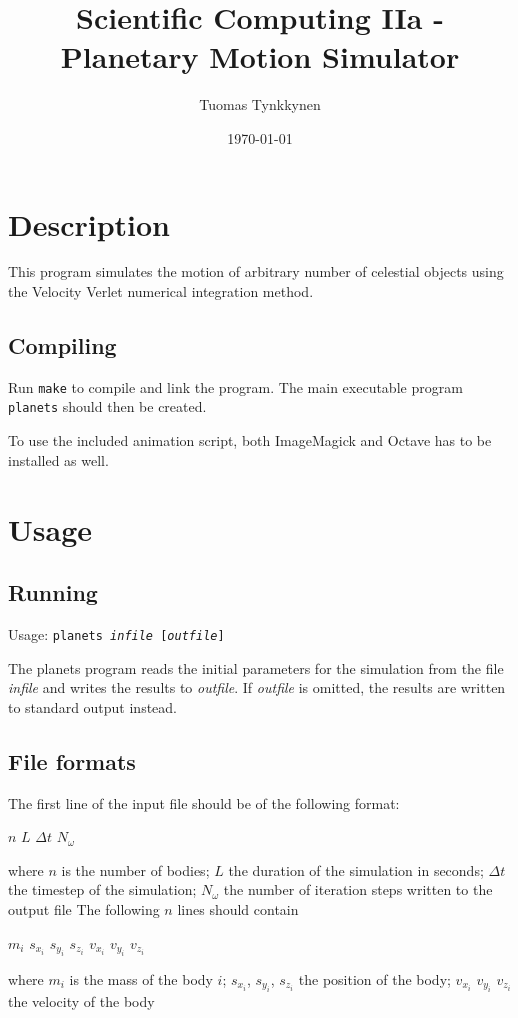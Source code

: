 \documentclass[a4paper]{article}
\title{Scientific Computing IIa - Planetary Motion Simulator}
\author{Tuomas Tynkkynen}
\date{\today}
\begin{document}
 \maketitle
 \section{Description}
 This program simulates the motion of arbitrary number of celestial objects using the Velocity Verlet\cite{VV} numerical integration method.
  \subsection{Compiling}
  Run \texttt{make} to compile and link the program.
  The main executable program \texttt{planets} should then be created.

  To use the included animation script, both ImageMagick and Octave has to be installed as well.
 \section{Usage}
  \subsection{Running}
  \begin{center}
  Usage: \texttt{planets \emph{infile} [\emph{outfile}]}\\
  \end{center}
  The planets program reads the initial parameters for the simulation from the file \emph{infile} and writes the results to \emph{outfile}.
  If \emph{outfile} is omitted, the results are written to standard output instead.
  \subsection{File formats}
   The first line of the input file should be of the following format:
   \begin{center}$n$ $L$ $\Delta t$ $N_\omega$\end{center}
   where $n$ is the number of bodies; $L$ the duration of the simulation in seconds; $\Delta t$ the timestep of the simulation;
   $N_\omega$ the number of iteration steps written to the output file
   The following $n$ lines should contain
   \begin{center}$m_i$ $s_{x_i}$ $s_{y_i}$ $s_{z_i}$ $v_{x_i}$ $v_{y_i}$ $v_{z_i}$\end{center}
   where $m_i$ is the mass of the body $i$; $s_{x_i}$, $s_{y_i}$, $s_{z_i}$ the position of the body; 
   $v_{x_i}$ $v_{y_i}$ $v_{z_i}$ the velocity of the body
\end{document}
